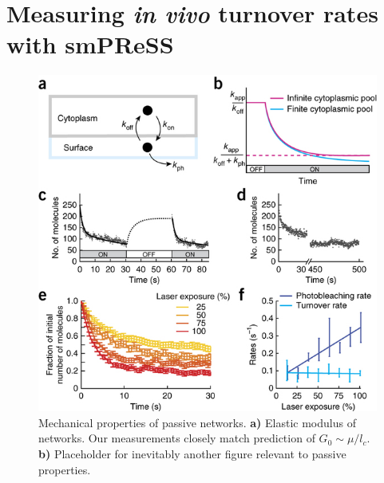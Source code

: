 \section{Measuring \textit{in vivo} turnover rates with smPReSS}


\begin{figure}[h!]
\centering
\includegraphics[width=\hsize]{nmeth/nmeth.jpg}
\caption{\label{fig:passive_supp}  Mechanical properties of passive networks.  \textbf{a)} Elastic modulus of networks.  Our measurements closely match prediction of $G_0\sim\mu/l_c$.  \textbf{b)}  Placeholder for inevitably another figure relevant to passive properties.}
\end{figure}